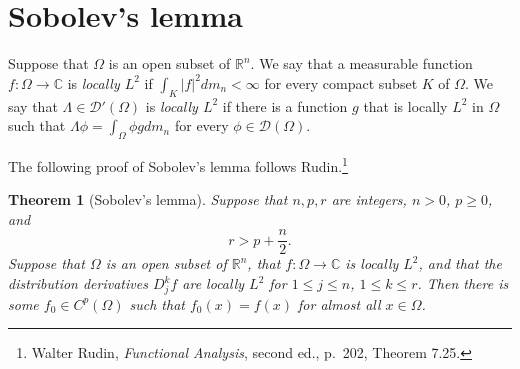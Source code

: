 \documentclass{article}
\newtheorem{theorem}{Theorem}
\theoremstyle{definition}
\begin{document}
\section{Sobolev's lemma}
Suppose that $\Omega$ is an open subset of $\mathbb{R}^n$. We say that a measurable function $f:\Omega \to \mathbb{C}$
 is {\em locally $L^2$}
if $\int_K |f|^2 dm_n<\infty$ for every compact subset $K$ of $\Omega$.
We say that $\Lambda \in \mathscr{D}'(\Omega)$ is {\em locally $L^2$} if there is a function $g$ that is locally $L^2$ in $\Omega$
such that $\Lambda \phi=\int_{\Omega} \phi g dm_n$ for every $\phi \in \mathscr{D}(\Omega)$.

 The following proof of Sobolev's lemma follows Rudin.\footnote{Walter Rudin, {\em Functional Analysis}, second ed., p.~202, Theorem 7.25.}

\begin{theorem}[Sobolev's lemma]
Suppose that $n,p,r$ are integers, $n>0$, $p \geq 0$, and 
\[
r>p+\frac{n}{2}.
\]
Suppose that $\Omega$ is an open subset of $\mathbb{R}^n$, that $f:\Omega \to \mathbb{C}$ is locally $L^2$, and that the distribution derivatives
$D_j^k f$ are locally $L^2$ for $1 \leq j \leq n$, $1 \leq k \leq r$. Then there is some $f_0 \in C^p(\Omega)$ such that $f_0(x)=f(x)$ for almost all $x \in \Omega$.
\end{theorem}
\end{document}
